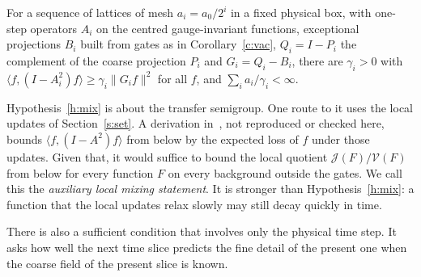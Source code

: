\begin{hypothesis}\label{h:mix}
For a sequence of lattices of mesh $a_i=a_0/2^i$ in a fixed physical box, with one-step operators $A_i$ on the
centred gauge-invariant functions, exceptional projections $B_i$ built from gates as in Corollary~\ref{c:vac},
$Q_i=I-P_i$ the complement of the coarse projection $P_i$ and $G_i=Q_i-B_i$, there are $\gamma_i>0$ with $\langle f,(I-A_i^2)f\rangle\ge\gamma_i\|G_if\|^2$ for all $f$, and
$\sum_ia_i/\gamma_i<\infty$.
\end{hypothesis}

Hypothesis~\ref{h:mix} is about the transfer semigroup. One route to it uses the local updates of
Section~\ref{s:set}. A derivation in~\cite{RepoInh}, not reproduced or checked here, bounds
$\langle f,(I-A^2)f\rangle$ from below by the expected loss of $f$ under those updates. Given that, it would
suffice to bound the local quotient $\mathcal J(F)/\mathcal V(F)$ from below for every function $F$ on every
background outside the gates. We call this the \emph{auxiliary local mixing statement}. It is stronger than
Hypothesis~\ref{h:mix}: a function that the local updates relax slowly may still decay quickly in time.

There is also a sufficient condition that involves only the physical time step. It asks how well the next
time slice predicts the fine detail of the present one when the coarse field of the present slice is known.

